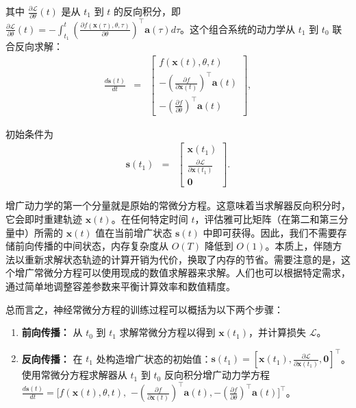 \noindent 其中 $\frac{\partial \mathcal{L}}{\partial \theta}(t)$ 是从 $t_1$ 到 $t$ 的反向积分，即 $\frac{\partial \mathcal{L}}{\partial \theta}(t) = - \int_{t_1}^{t} \left( \frac{\partial f(\mathbf{x}(\tau), \theta, \tau)}{\partial \theta} \right)^\top \mathbf{a}(\tau) d\tau$。这个组合系统的动力学从 $t_1$ 到 $t_0$ 联合反向求解：
\begin{eqnarray}
\frac{d \mathbf{s}(t)}{dt} & = & \begin{bmatrix} f(\mathbf{x}(t), \theta, t) \\ - \left( \frac{\partial f}{\partial \mathbf{x}(t)} \right)^\top \mathbf{a}(t) \\ - \left( \frac{\partial f}{\partial \theta} \right)^\top \mathbf{a}(t) \end{bmatrix},
\end{eqnarray}

\noindent 初始条件为
\begin{eqnarray}
\mathbf{s}(t_1) & = & \begin{bmatrix} \mathbf{x}(t_1) \\ \frac{\partial \mathcal{L}}{\partial \mathbf{x}(t_1)} \\ \mathbf{0} \end{bmatrix}.
\end{eqnarray}

增广动力学的第一个分量就是原始的常微分方程。这意味着当求解器反向积分时，它会即时重建轨迹 $\mathbf{x}(t)$。在任何特定时间 $t$，评估雅可比矩阵（在第二和第三分量中）所需的 $\mathbf{x}(t)$ 值在当前增广状态 $\mathbf{s}(t)$ 中即可获得。因此，我们不需要存储前向传播的中间状态，内存复杂度从 $O(T)$ 降低到 $O(1)$。本质上，伴随方法以重新求解状态轨迹的计算开销为代价，换取了内存的节省。需要注意的是，这个增广常微分方程可以使用现成的数值求解器来求解。人们也可以根据特定需求，通过简单地调整容差参数来平衡计算效率和数值精度。

总而言之，神经常微分方程的训练过程可以概括为以下两个步骤：

\begin{enumerate}
    \item \textbf{前向传播：} 从 $t_0$ 到 $t_1$ 求解常微分方程以得到 $\mathbf{x}(t_1)$，并计算损失 $\mathcal{L}$。
    \item \textbf{反向传播：} 在 $t_1$ 处构造增广状态的初始值：$\mathbf{s}(t_1) = [\mathbf{x}(t_1), \frac{\partial \mathcal{L}}{\partial \mathbf{x}(t_1)}, \mathbf{0}]^\top$。使用常微分方程求解器从 $t_1$ 到 $t_0$ 反向积分增广动力学方程 $\frac{d \mathbf{s}(t)}{dt} = [f(\mathbf{x}(t), \theta, t),$ $- \left( \frac{\partial f}{\partial \mathbf{x}(t)} \right)^\top \mathbf{a}(t), - \left( \frac{\partial f}{\partial \theta} \right)^\top \mathbf{a}(t)]^\top$。
\end{enumerate}

